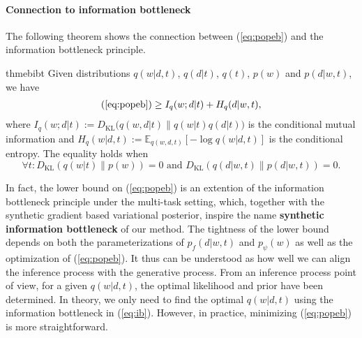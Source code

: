 \documentclass{article} \usepackage{iclr2020_conference,times}
\def\eqref#1{(\ref{#1})}
\newcommand{\E}{\mathbb{E}}
\begin{document}
\paragraph{Connection to information bottleneck}
The following theorem shows the connection between \eqref{eq:popeb} and the information bottleneck principle.


\begin{restatable*}{thm}{ebibt}
    \label{thm:ib}
    Given distributions $q(w | d, t)$, $q(d|t)$, $q(t)$, $p(w)$ and $p(d | w, t)$, we have
\begin{align}
    \label{eq:ib}
\eqref{eq:popeb} \geq I_q(w; d | t) + H_{q}(d | w, t),
\end{align}
    where $I_q(w; d | t) := D_\text{KL}\big( q(w,d | t) \| q(w | t) q(d | t) \big)$ is the conditional mutual information
    and $H_{q}(w | d, t) := \E_{q(w, d, t)} [-\log q(w | d, t)]$ is the conditional entropy.
The equality holds when 
    $$
    \forall t \colon D_\text{KL}(q(w|t) \| p(w)) = 0 \,\,\text{and}\,\, D_\text{KL}(q(d|w,t) \| p(d|w,t)) = 0.
    $$
\end{restatable*}
In fact, the lower bound on \eqref{eq:popeb} is an extention of the information bottleneck principle \citep{Achille17} under the multi-task setting,
which, together with the synthetic gradient based variational posterior, 
    inspire the name \textbf{synthetic information bottleneck} of our method.
The tightness of the lower bound depends on both 
the parameterizations of $p_f(d | w, t)$ and $p_\psi(w)$ 
as well as the optimization of \eqref{eq:popeb}.
It thus can be understood as how well we can align the inference process with the generative process.
    From an inference process point of view, for a given $q(w | d, t)$, the optimal likelihood and prior have been determined.
    In theory, we only need to find the optimal $q(w | d, t)$ using the information bottleneck in \eqref{eq:ib}.
    However, in practice, minimizing \eqref{eq:popeb} is more straightforward.
\end{document}
